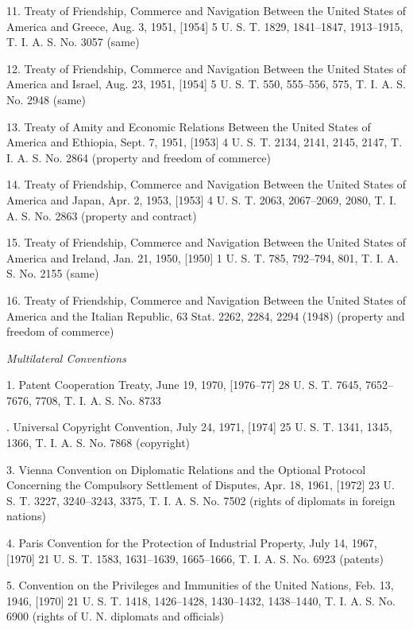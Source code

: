     11. Treaty of Friendship, Commerce and Navigation Between the
    United States of America and Greece, Aug. 3, 1951, [1954] 5 U. S. T.
    1829, 1841--1847, 1913--1915, T. I. A. S. No. 3057 (same)

    12. Treaty of Friendship, Commerce and Navigation Between the
    United States of America and Israel, Aug. 23, 1951, [1954] 5 U. S.
    T. 550, 555--556, 575, T. I. A. S. No. 2948 (same)

    13. Treaty of Amity and Economic Relations Between the United
    States of America and Ethiopia, Sept. 7, 1951, [1953] 4 U. S. T.
    2134, 2141, 2145, 2147, T. I. A. S. No. 2864 (property and freedom
    of commerce)

    14. Treaty of Friendship, Commerce and Navigation Between the
    United States of America and Japan, Apr. 2, 1953, [1953] 4 U. S.
    T. 2063, 2067--2069, 2080, T. I. A. S. No. 2863 (property and
    contract)

    15. Treaty of Friendship, Commerce and Navigation Between the
    United States of America and Ireland, Jan. 21, 1950, [1950] 1 U. S.
    T. 785, 792--794, 801, T. I. A. S. No. 2155 (same)

    16. Treaty of Friendship, Commerce and Navigation Between the
    United States of America and the Italian Republic, 63 Stat. 2262,
    2284, 2294 (1948) (property and freedom of commerce)

\emph{Multilateral Conventions}

    1. Patent Cooperation Treaty, June 19, 1970, [1976--77] 28 U. S.
    T. 7645, 7652--7676, 7708, T. I. A. S. No. 8733

    . Universal Copyright Convention, July 24, 1971, [1974]
    25 U. S. T. 1341, 1345, 1366, T. I. A. S. No. 7868 (copyright)

    3. Vienna Convention on Diplomatic Relations and the Optional
    Protocol Concerning the Compulsory Settlement of Disputes, Apr. 18,
    1961, [1972] 23 U. S. T. 3227, 3240--3243, 3375, T. I. A. S. No.
    7502 (rights of diplomats in foreign nations)

    4. Paris Convention for the Protection of Industrial Property,
    July 14, 1967, [1970] 21 U. S. T. 1583, 1631--1639, 1665--1666, T.
    I. A. S. No. 6923 (patents)

    5. Convention on the Privileges and Immunities of the United
    Nations, Feb. 13, 1946, [1970] 21 U. S. T. 1418, 1426--1428,
    1430--1432, 1438--1440, T. I. A. S. No. 6900 (rights of U. N.
    diplomats and officials)

